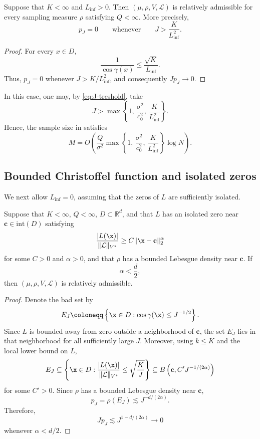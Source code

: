 \documentclass[10pt,dvipsnames]{amsart}
\begin{document}
\begin{lemma}
\label{lem:finite-K-positive-Linf}
Suppose that \(K<\infty\) and \(L_{\inf}>0\).
Then \((\mu,\rho,V,\mathcal L)\) is relatively admissible for every sampling measure \(\rho\) satisfying \(Q<\infty\). More precisely,
\[
    p_J=0
    \qquad\text{whenever}\qquad
    J>\frac{K}{L_{\inf}^2}.
\]
\end{lemma}

\begin{proof}
For every \(x\in D\),
\[
    \frac{1}{\cos\gamma(x)}
    \leq
    \frac{\sqrt K}{L_{\inf}}.
\]
Thus, \(p_J=0\) whenever \(J>K/L_{\inf}^2\), and consequently
\(Jp_J\to0\).
\end{proof}
\begin{remark}
In this case, one may, by \eqref{eq:J-treshold}, take
\[
    J>
    \max\left\{
        1,\,
        \frac{\sigma^2}{c_0^2},\,
        \frac{K}{L_{\inf}^2}
    \right\}.
\]
Hence, the sample size in 
satisfies
\[
    M
    =
    O\left(
        \frac{Q}{\sigma^2}
        \max\left\{
            1,\,
            \frac{\sigma^2}{c_0^2},\,
            \frac{K}{L_{\inf}^2}
        \right\}
        \log N
    \right).
\]
\end{remark}




\subsection{Bounded Christoffel function and isolated zeros}
\label{ssec:finite-K-zero-Linf}

We next allow \(L_{\inf}=0\), assuming that the zeros of \(L\) are
sufficiently isolated.

\begin{lemma}
\label{lem:finite-K-isolated-zero}
Suppose that \(K<\infty\), \(Q < \infty\), \(D\subset\mathbb R^d\), and 
that $L$ has an isolated zero near $\mathbf{c} \in \mathrm{int}(D)$ satisfying
\[
    \frac{|L(\x)|}{\|\mathcal L\|_{V^*}}
    \geq
    C\|\x-\mathbf{c}\|_2^\alpha
\]
for some \(C>0\) and \(\alpha>0\), and that \(\rho\) has a bounded
Lebesgue density near \(\mathbf{c}\). If
\[
    \alpha<\frac d2,
\]
then \((\mu,\rho,V,\mathcal L)\) is relatively admissible.
\end{lemma}

\begin{proof}
Denote the bad set by
\[
    E_J
    \coloneqq
    \left\{
        \x\in D:
        \cos\gamma(\x)\leq J^{-1/2}
    \right\}.
\]
Since \(L\) is bounded away from zero outside a neighborhood of \(\mathbf{c}\),
the set \(E_J\) lies in that neighborhood for all sufficiently large \(J\).
Moreover, using \(k\leq K\) and the local lower bound on \(L\),
\[
    E_J
    \subseteq
    \left\{
        \x\in D:
        \frac{|L(\x)|}{\|\mathcal L\|_{V^*}}
        \leq
        \sqrt{\frac{K}{J}}
    \right\}
    \subseteq
    B\left(\mathbf{c},C'J^{-1/(2\alpha)}\right)
\]
for some \(C'>0\). Since \(\rho\) has a bounded Lebesgue density near
\(\mathbf{c}\),
\[
    p_J
    =
    \rho(E_J)
    \lesssim
    J^{-d/(2\alpha)}.
\]
Therefore,
\[
    Jp_J
    \lesssim
    J^{1-d/(2\alpha)}
    \longrightarrow0
\]
whenever \(\alpha<d/2\).
\end{proof}
\end{document}

